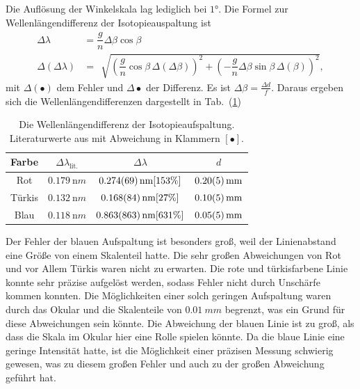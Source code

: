 \documentclass[sn-mathphys-num,iicol]{sn-jnl}
\theoremstyle{thmstyleone}
\theoremstyle{thmstyletwo}
\theoremstyle{thmstylethree}
\begin{document}
Die Auflösung der Winkelskala lag lediglich bei $\ang{1}$.
Die Formel zur Wellenlängendifferenz der Isotopieauspaltung ist
\begin{align} 
        \Delta \lambda &=\dfrac{g}{n}\Delta \beta \cos \beta\\
        \Delta \left(\Delta \lambda \right) &= \,\sqrt[]{\left(\dfrac{g}{n}\cos \beta \,\Delta \left(\Delta \beta \right)\right)^2+\left(-\dfrac{g}{n}\Delta \beta \sin \beta \,\Delta \left(\beta \right)\right)^2}
,\end{align} 
mit $\Delta \left(\bullet\right)$ dem Fehler und $\Delta \bullet $ der Differenz.
Es ist $\Delta \beta =\tfrac{\Delta d}{f}$.
Daraus ergeben sich die Wellenlängendifferenzen dargestellt in Tab.\ (\ref{tab:isotopie_okular})

\begin{table}[h]
        \begin{tabular}{cccc}
                Farbe & $\Delta \lambda _\text{lit.}$ & $\Delta \lambda $ &  $d$ \\
                \hline
                Rot & $\SI{0.179}{\nano m}$& $\SI{0.274+-0.069}{\nano m}[153\%]$  & $\SI{0.2+-0.05}{mm}$ \\
                Türkis& $\SI{0.132}{\nano m}$ & $\SI{0.168+-0.084}{\nano m}[27\%]$  & $\SI{0.1+-0.05}{mm}$ \\
                Blau & $\SI{0.118}{\nano m}$& $\SI{0.863+-0.863}{\nano m}[631\%]$  & $\SI{0.05+-0.05}{mm}$ 
        \end{tabular}
        \caption{Die Wellenlängendifferenz der Isotopieaufspaltung. Literaturwerte aus \cite{LeyboldBalmerserieBeobachtung} mit Abweichung in Klammern $[\bullet ]$.} \label{tab:isotopie_okular}
\end{table}
Der Fehler der blauen Aufspaltung ist besonders groß, weil der Linienabstand eine Größe von einem Skalenteil hatte.
Die sehr großen Abweichungen von Rot und vor Allem Türkis waren nicht zu erwarten.
Die rote und türkisfarbene Linie konnte sehr präzise aufgelöst werden, sodass Fehler nicht durch Unschärfe kommen konnten.
Die Möglichkeiten einer solch geringen Aufspaltung waren durch das Okular und die Skalenteile von $\SI{0.01}{mm}$ begrenzt, was ein Grund für diese Abweichungen sein könnte.
Die Abweichung der blauen Linie ist zu groß, als dass die Skala im Okular hier eine Rolle spielen könnte.
Da die blaue Linie eine geringe Intensität hatte, ist die Möglichkeit einer präzisen Messung schwierig gewesen, was zu diesem großen Fehler und auch zu der großen Abweichung geführt hat.
\end{document}
